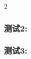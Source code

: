 \documentclass[a4paper,onecolumn,twoside]{article}
\begin{document}
\begin{multicols}{2}
\subsubsection{测试2:}
\subsubsection{测试3:}
  \renewcommand\refname{参考文献}
  
  \xiaowuhao{
  
   
  \setlength{\itemsep}{- 2mm}
}

\clearpage
\end{multicols}
\end{document}
